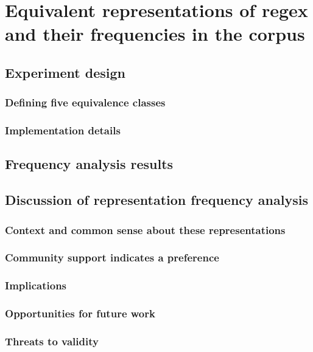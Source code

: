 \chapter{Equivalent representations of regex and their frequencies in the corpus}
\section{Experiment design}
\subsection{Defining five equivalence classes}
\subsection{Implementation details}
\section{Frequency analysis results}
\section{Discussion of representation frequency analysis}
\subsection{Context and common sense about these representations}
\subsection{Community support indicates a preference}
\subsection{Implications}
\subsection{Opportunities for future work}
\subsection{Threats to validity}

